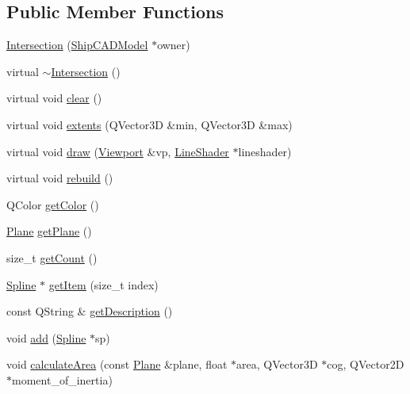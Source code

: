 \subsection*{Public Member Functions}
\begin{DoxyCompactItemize}
\item 
\hyperlink{classShipCAD_1_1Intersection_acde7d35483e1e4ee56ecf75eb7a70f66}{Intersection} (\hyperlink{classShipCAD_1_1ShipCADModel}{Ship\-C\-A\-D\-Model} $\ast$owner)
\item 
virtual \hyperlink{classShipCAD_1_1Intersection_a064951a970ed8dd11081b2903ab62122}{$\sim$\-Intersection} ()
\item 
virtual void \hyperlink{classShipCAD_1_1Intersection_a2163245dc7153d1590811ab2902d6ee4}{clear} ()
\item 
virtual void \hyperlink{classShipCAD_1_1Intersection_af751d515708531ca098321840a92c47b}{extents} (Q\-Vector3\-D \&min, Q\-Vector3\-D \&max)
\item 
virtual void \hyperlink{classShipCAD_1_1Intersection_a9e346019a52aa0540628b75994ea94a5}{draw} (\hyperlink{classShipCAD_1_1Viewport}{Viewport} \&vp, \hyperlink{classShipCAD_1_1LineShader}{Line\-Shader} $\ast$lineshader)
\item 
virtual void \hyperlink{classShipCAD_1_1Intersection_aed30bdca43037f72b85c4d53e234fd6c}{rebuild} ()
\item 
Q\-Color \hyperlink{classShipCAD_1_1Intersection_acae07360e9ccef12a498332ac6dbedd9}{get\-Color} ()
\item 
\hyperlink{classShipCAD_1_1Plane}{Plane} \hyperlink{classShipCAD_1_1Intersection_ac0b838a811f8df5c2fa0b0ea44ba4bb7}{get\-Plane} ()
\item 
size\-\_\-t \hyperlink{classShipCAD_1_1Intersection_a797f11943dee7cf12e3c6b0995b67a60}{get\-Count} ()
\item 
\hyperlink{classShipCAD_1_1Spline}{Spline} $\ast$ \hyperlink{classShipCAD_1_1Intersection_a22bce61f4ecfda5ae23351d186bda831}{get\-Item} (size\-\_\-t index)
\item 
const Q\-String \& \hyperlink{classShipCAD_1_1Intersection_a3dfeca59ddc0235a665475718bae11ae}{get\-Description} ()
\item 
void \hyperlink{classShipCAD_1_1Intersection_a8df5b7c6e9ed3e59f2c521df5bf8c5da}{add} (\hyperlink{classShipCAD_1_1Spline}{Spline} $\ast$sp)
\item 
void \hyperlink{classShipCAD_1_1Intersection_ade472c721a5cb093c0b464c770c88634}{calculate\-Area} (const \hyperlink{classShipCAD_1_1Plane}{Plane} \&plane, float $\ast$area, Q\-Vector3\-D $\ast$cog, Q\-Vector2\-D $\ast$moment\-\_\-of\-\_\-inertia)

\end{DoxyCompactItemize}
